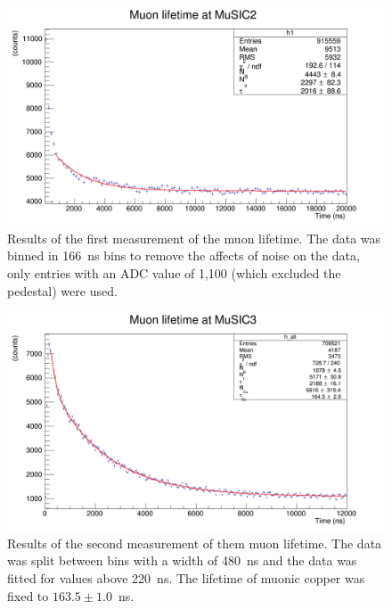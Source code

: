 \begin{figure}[hptb]
  \centering
  \includegraphics[width=.9\textwidth]{images/lifetime/music2_mu_lifetime_good.png}
  \caption{Results of the first measurement of the muon lifetime. The data was binned in 166~ns bins to remove the affects of noise on the data, only entries with an ADC value of 1,100 (which excluded the pedestal) were used.}
  \label{fig:music2_mu_lifetime}
\end{figure}
\begin{figure}[hptb]
  \centering
  \includegraphics[width=.9\textwidth]{images/lifetime/music3_muon_lifetime.png}
  \caption{Results of the second measurement of them muon lifetime. The data was split between bins with a width of 480~ns and the data was fitted for values above 220~ns. The lifetime of muonic copper was fixed to \( 163.5\pm1.0 \)~ns.}
  \label{fig:music3_muon_lifetime}
\end{figure}

